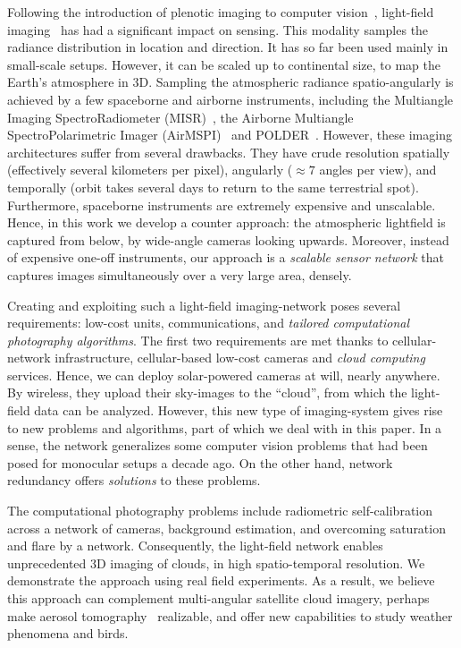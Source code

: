 \documentclass[runningheads]{llncs}
\begin{document}
Following the introduction of plenotic imaging to computer vision~\cite{Adelson1992}, light-field imaging~\cite{Basha2012,bishop,horstmeyer,Ng1948,kim} has had a significant impact on sensing. This modality samples the radiance distribution in location and direction. It has so far been used mainly in small-scale setups. However, it can be scaled up to continental size, to map the Earth's atmosphere in 3D. Sampling the atmospheric radiance spatio-angularly is achieved by a few spaceborne and airborne instruments, including the Multiangle Imaging SpectroRadiometer (MISR)~\cite{diner,Diner1998}, the Airborne Multiangle SpectroPolarimetric Imager (AirMSPI)~\cite{dinerDavis07,dinerDavis10} and POLDER~\cite{baxter,breon,vanMol}.
However, these imaging architectures suffer from several drawbacks. They have crude resolution spatially (effectively several kilometers per pixel), angularly  ($\approx 7$ angles per view), and temporally (orbit takes several days to return to the same terrestrial spot). Furthermore, spaceborne instruments are extremely expensive and unscalable. Hence, in this work we develop a counter approach: the atmospheric lightfield is captured  from below, by wide-angle cameras looking upwards. Moreover, instead of expensive one-off instruments, our approach is a {\em scalable sensor network} that captures images simultaneously over a very large area, densely.

Creating and exploiting such a light-field imaging-network poses several requirements: low-cost units,
communications, and {\em tailored computational photography algorithms}. The first two requirements are met  thanks to cellular-network infrastructure, cellular-based low-cost cameras and {\em cloud computing} services. Hence, we can deploy solar-powered cameras at will, nearly anywhere. By wireless, they upload their sky-images to the ``cloud'', from which the light-field data can be analyzed. However, this new type of imaging-system gives rise to new problems and algorithms, part of which we deal with in this paper. In a sense, the network generalizes some computer vision problems that had been posed for monocular setups a decade ago. On the other hand, network redundancy offers {\em solutions} to these problems.

The computational photography problems include radiometric self-calibration across a network of cameras, background estimation, and overcoming saturation and flare by a network. Consequently, the light-field network enables unprecedented 3D imaging of clouds, in high spatio-temporal resolution.  We demonstrate the approach using real field experiments. As a result, we believe this approach can complement multi-angular satellite cloud imagery, perhaps make aerosol tomography~\cite{Aides:13} realizable, and offer new capabilities to study weather phenomena and birds.
\end{document}
